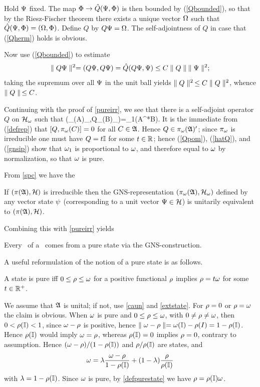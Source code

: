 Hold $\Psi$ fixed. The map $\Phi\rightarrow \hat{Q}(\Psi,\Phi)$ is then bounded
by (\ref{Qbounded}), so that by the Riesz-Fischer theorem there exists
a unique vector $\Omega$ such that $\hat{Q}(\Psi,\Phi)=(\Omega,\Phi)$. Define
$Q$ by $Q\Psi=\Omega$.  The self-adjointness of $Q$ in case that
(\ref{Qherm}) holds is obvious.

Now use (\ref{Qbounded}) to estimate
$$
\parallel Q\Psi\parallel^2=(Q\Psi,Q\Psi)=\hat{Q}(Q\Psi,\Psi)\leq C\parallel Q\parallel\:\parallel\Psi\parallel^2;
$$ 
taking the supremum over all $\Psi$ in the unit ball yields $\parallel
Q\parallel^2\,\leq C\parallel Q\parallel^2$, whence $\parallel Q\parallel\,\leq C$.  \enp

Continuing with the proof of \ref{pureirr}, we see that there is a
self-adjoint operator $Q$ on ${\cal H}_{\omega}$ such that \be
(\pi_{\om}(A)\Om_{\om},Q\pi_{\om}(B)\Om_{\om})=\lm\om_1(A^*B). 
\ee It is the immediate from (\ref{defrep}) that $[Q,\pi_{\omega}(C)]=0$
for all $C\in{\frak A}$.  Hence $Q\in\pi_{\omega}({\frak A})'$; since $\pi_{\omega}$ is
irreducible one must have $Q=t{\Bbb I}$ for some $t\in{\Bbb R}$; hence
(\ref{Qpom}), (\ref{hatQ}), and (\ref{gnsip}) show that $\omega_1$ is
proportional to $\omega$, and therefore equal to $\omega$ by normalization,
so that $\omega$ is pure.\enp

From \ref{spc} we have the
\begin{Corollary}
  If $(\pi({\frak A}),{\cal H})$ is irreducible then the GNS-represen\-ta\-tion
$(\pi_{\omega}({\frak A}),{\cal H}_{\omega})$ defined by any vector state $\psi$
(corresponding to a unit vector $\Psi\in{\cal H}$) is unitarily equivalent to
$(\pi({\frak A}),{\cal H})$.
\end{Corollary}

Combining this with \ref{pureirr} yields
\begin{Corollary}
Every \irrep\ of a \ca\ comes from a pure state via the
GNS-construction.
\end{Corollary}

A useful reformulation of the notion of a pure state is as follows.
\begin{Proposition}
A state is pure iff $0\leq\rho\leq\omega$ for a positive functional $\rho$
implies $\rho=t\omega$ for some $t\in{\Bbb R}^+$.
\end{Proposition}

We assume that ${\frak A}$ is unital; if not, use \ref{caun} and
\ref{extstate}. For $\rho=0$ or $\rho=\omega$ the claim is obvious.  When
$\omega$ is pure and $0\leq\rho\leq\omega$, with $0\neq\rho\neq\omega$, then
$0<\rho({\Bbb I})<1$, since $\omega-\rho$ is positive, hence $\parallel
\omega-\rho\parallel=\omega({\Bbb I})-\rho(I)=1-\rho({\Bbb I})$. Hence $\rho({\Bbb I})$ would imply
$\omega=\rho$, whereas $\rho({\Bbb I})=0$ implies $\rho=0$, contrary to
assumption.  Hence $(\omega-\rho)/(1-\rho({\Bbb I}))$ and $\rho/\rho({\Bbb I})$ are
states, and
$$
\omega=\lambda\frac{\omega-\rho}{1-\rho({\Bbb I})} +(1-\lambda)\frac{\rho}{\rho({\Bbb I})}
$$
with $\lambda=1-\rho({\Bbb I})$. Since $\omega$ is pure, by \ref{defpurestate} we
have $\rho=\rho({\Bbb I})\omega$.

